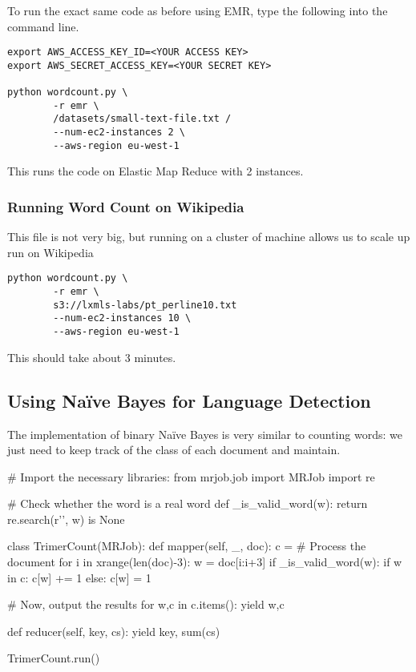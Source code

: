 To run the exact same code as before using EMR, type the following into the command line.

\begin{verbatim}
export AWS_ACCESS_KEY_ID=<YOUR ACCESS KEY>
export AWS_SECRET_ACCESS_KEY=<YOUR SECRET KEY>

python wordcount.py \
        -r emr \
        /datasets/small-text-file.txt /
        --num-ec2-instances 2 \
        --aws-region eu-west-1
\end{verbatim}

This runs the code on Elastic Map Reduce with 2 instances.

\subsubsection{Running Word Count on Wikipedia}

This file is not very big, but running on a cluster of machine allows us to
scale up run on Wikipedia

\begin{verbatim}
python wordcount.py \
        -r emr \
        s3://lxmls-labs/pt_perline10.txt
        --num-ec2-instances 10 \
        --aws-region eu-west-1
\end{verbatim}

This should take about 3 minutes.

\subsection{Using Naïve Bayes for Language Detection}

The implementation of binary Naïve Bayes is very similar to counting words: we just
need to keep track of the class of each document and maintain.

\begin{python}
# Import the necessary libraries:
from mrjob.job import MRJob
import re

# Check whether the word is a real word
def _is_valid_word(w):
    return re.search(r'\W', w) is None

class TrimerCount(MRJob):
    def mapper(self, _, doc):
        c = {}
        # Process the document
        for i in xrange(len(doc)-3):
            w = doc[i:i+3]
            if _is_valid_word(w):
                if w in c:
                    c[w] += 1
                else:
                    c[w] = 1

        # Now, output the results
        for w,c in c.items():
            yield w,c

    def reducer(self, key, cs):
        yield key, sum(cs)

TrimerCount.run()
\end{python}

